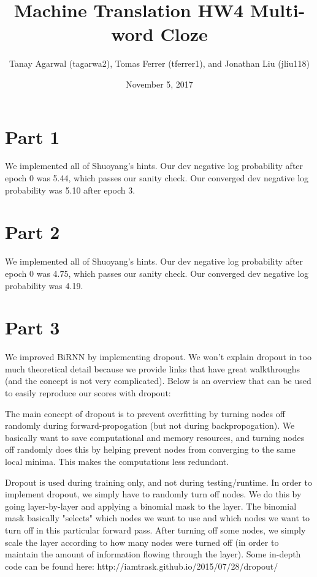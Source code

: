 \documentclass{article}
\title{Machine Translation HW4 Multi-word Cloze}
\author{Tanay Agarwal (tagarwa2), Tomas Ferrer (tferrer1), and Jonathan Liu (jliu118)}
\date{November 5, 2017}
\begin{document}
\maketitle


\section{Part 1}

We implemented all of Shuoyang's hints. Our dev negative log probability after epoch 0 was 5.44, which passes our sanity check. Our converged dev negative log probability was 5.10 after epoch 3.

\section{Part 2}

We implemented all of Shuoyang's hints. Our dev negative log probability after epoch 0 was 4.75, which passes our sanity check. Our converged dev negative log probability was 4.19.

\section{Part 3}

We improved BiRNN by implementing dropout. We won't explain dropout in too much theoretical detail because we provide links that have great walkthroughs (and the concept is not very complicated). Below is an overview that can be used to easily reproduce our scores with dropout:

The main concept of dropout is to prevent overfitting by turning nodes off randomly during forward-propogation (but not during backpropogation). We basically want to save computational and memory resources, and turning nodes off randomly does this by helping prevent nodes from converging to the same local minima. This makes the computations less redundant.

Dropout is used during training only, and not during testing/runtime. In order to implement dropout, we simply have to randomly turn off nodes. We do this by going layer-by-layer and applying a binomial mask to the layer. The binomial mask basically "selects" which nodes we want to use and which nodes we want to turn off in this particular forward pass. After turning off some nodes, we simply scale the layer according to how many nodes were turned off (in order to maintain the amount of information flowing through the layer). Some in-depth code can be found here: http://iamtrask.github.io/2015/07/28/dropout/
\end{document}
